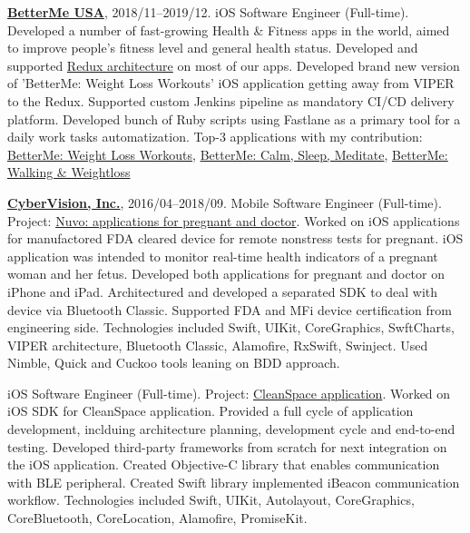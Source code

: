 \documentclass{nk-resume}
\begin{document}
\vspace*{14px}

\textbf{\href{https://betterme.world/about}{BetterMe USA}}, 2018/11--2019/12. 
iOS Software Engineer (Full-time).
\newline Developed a number of fast-growing Health \& Fitness apps in the world, 
aimed to improve people’s fitness level and general health status. Developed and supported 
\href{https://www.raywenderlich.com/books/advanced-ios-app-architecture/v3.0/chapters/6-architecture-redux}{Redux architecture} 
on most of our apps. Developed brand new version of 'BetterMe: Weight Loss Workouts' iOS application 
getting away from VIPER to the Redux. Supported custom Jenkins pipeline as mandatory CI/CD delivery platform. 
Developed bunch of Ruby scripts using Fastlane as a primary tool for a daily work tasks automatization.
Top-3 applications with my contribution: 
\href{https://apps.apple.com/us/app/betterme-weight-loss-workouts/id1264546236}{BetterMe: Weight Loss Workouts}, 
\href{https://apps.apple.com/us/app/betterme-calm-sleep-meditate/id1363010081}{BetterMe: Calm, Sleep, Meditate}, 
\href{https://apps.apple.com/us/app/betterme-walking-weightloss/id1434400695}{BetterMe: Walking \& Weightloss}

\vspace*{14px}

\textbf{\href{https://www.cybervisiontech.com}{CyberVision, Inc.}}, 2016/04–2018/09.
\newline Mobile Software Engineer (Full-time). Project: \href{https://www.nuvocares.com/solutions}{Nuvo: applications for pregnant and doctor}.
\newline Worked on iOS applications for manufactored FDA cleared device for remote nonstress tests for pregnant. 
iOS application was intended to monitor real-time health indicators of a pregnant woman and her fetus. 
Developed both applications for pregnant and doctor on iPhone and iPad.
Architectured and developed a separated SDK to deal with device via Bluetooth Classic.
Supported FDA and MFi device certification from engineering side.
\newline Technologies included Swift, UIKit, CoreGraphics, SwftCharts, VIPER architecture, 
Bluetooth Classic, Alamofire, RxSwift, Swinject. Used Nimble, Quick and Cuckoo tools leaning on BDD approach.

\vspace*{7px}

iOS Software Engineer (Full-time). Project: \href{https://www.sensynehealth.com/cleanspace}{CleanSpace application}.
\newline Worked on iOS SDK for CleanSpace application. 
Provided a full cycle of application development, inclduing architecture planning, 
development cycle and end-to-end testing.
Developed third-party frameworks from scratch for next integration on the iOS application.
Created Objective-C library that enables communication with BLE peripheral.
Created Swift library implemented iBeacon communication workflow. 
\newline Technologies included Swift, UIKit, Autolayout, CoreGraphics, CoreBluetooth, CoreLocation, Alamofire, PromiseKit.
\end{document}
